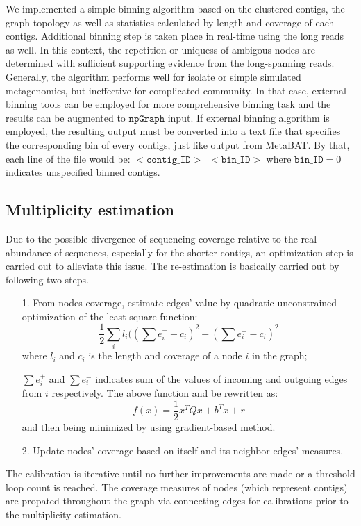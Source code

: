 \documentclass[10pt,twocolumn,twoside]{genpaper}
\newcommand{\npgraph}{$\mathtt{npGraph}$}
\begin{document}
We implemented a simple binning algorithm based on the clustered contigs, the graph topology as well as statistics calculated by length and coverage of each contigs. 
Additional binning step is taken place in real-time using the long reads as well. In this context, the repetition or uniquess of ambigous nodes are determined with sufficient supporting evidence from the long-spanning reads.
Generally, the algorithm performs well for isolate or simple simulated metagenomics, but ineffective for complicated community. In that case, external binning tools can be employed for more comprehensive binning task and the results can be augmented to \npgraph{} input.
If external binning algorithm is employed, the resulting output must be converted into a text file that specifies the corresponding bin of every contigs, just like output from MetaBAT. By that, each line of the file would be:
$
\mathtt{<contig\_ID>} \; ~ \mathtt{<bin\_ID>}
$
where $\mathtt{bin\_ID}=0$ indicates unspecified binned contigs.
\subsection*{Multiplicity estimation}
Due to the possible divergence of sequencing coverage relative to the real abundance of sequences, especially for the shorter contigs, an optimization step is carried out to alleviate this issue.
The re-estimation is basically carried out by following two steps.
\begin{itemize}
\item[1.] From nodes coverage, estimate edges' value by quadratic unconstrained optimization of the least-square function:
$$\frac{1}{2}\sum_{i}{l_i((\sum{e^{+}_{i}}-c_i)^2+(\sum{e^{-}_{i}}-c_i)^2}$$
where $l_i$ and $c_i$ is the length and coverage of a node $i$ in the graph;

$\sum{e^{+}_{i}}$ and $\sum{e^{-}_{i}}$ indicates sum of the values of incoming and outgoing edges from $i$ respectively. 
The above function and be rewritten as:
$$f(x)=\frac{1}{2}x^TQx + b^Tx + r$$
and then being minimized by using gradient-based method.
\item[2.] Update nodes' coverage based on itself and its neighbor edges' measures.
\end{itemize}
The calibration is iterative until no further improvements are made or a threshold loop count is reached.
The coverage measures of nodes (which represent contigs) are propated throughout the graph via connecting edges for calibrations prior to the multiplicity estimation. 
\end{document}
